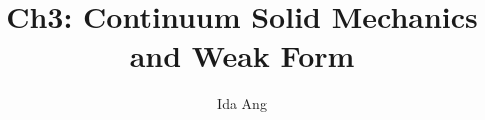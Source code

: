 \documentclass[12pt,3p]{article}
\numberwithin{equation}{section}
\begin{document}
\title{Ch3: Continuum Solid Mechanics and Weak Form}
\author{Ida Ang}
\date{\vspace{-5ex}}
\maketitle

\tableofcontents
\newpage

\begin{align}
\begin{split}
\end{split}
\end{align}
\end{document}
